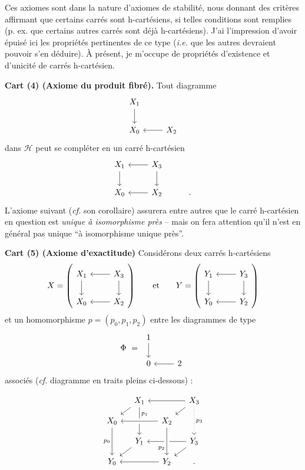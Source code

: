 \noindent Ces axiomes sont dans la nature d'axiomes de stabilité, nous donnant des critères affirmant que certains carrés sont h-cartésiens, si telles conditions sont remplies (p. ex. que certains autres carrés sont déjà h-cartésiens). J'ai l'impression d'avoir épuisé ici les propriétés pertinentes de ce type (\textit{i.e.} que les autres devraient pouvoir s'en déduire). À présent, je m'occupe de propriétés d'existence et d'unicité de carrés h-cartésien. %

\noindent\textbf{Cart (4) (Axiome du produit fibré).} Tout diagramme
\[
\begin{tikzcd}
X_1 \arrow[d] & \\
X_0 & X_2 \arrow[l]
\end{tikzcd}
\]
dans $\mathcal{H}$ peut se compléter en un carré h-cartésien
\[
\begin{tikzcd}
X_1 \arrow[d] & X_3 \arrow[l] \arrow[d] & \\
X_0 & X_2 \arrow[l] & .
\end{tikzcd}
\]
L'axiome suivant (\textit{cf.} son corollaire) assurera entre autres que le carré h-cartésien en question est \textit{unique à isomorphisme près} – mais on fera attention qu'il n'est en général pas unique “à isomorphisme unique près”.


\textbf{Cart (5) (Axiome d'exactitude)} Considérons deux carrés h-cartésiens
\[
X = \left(\begin{tikzcd}
X_1 \ar[d] & X_3 \ar[l] \ar[d] \\
X_0 & X_2 \ar[l]
\end{tikzcd}\right)
\qquad \text{et} \qquad
Y = \left(\begin{tikzcd}
Y_1 \ar[d] & Y_3 \ar[l] \ar[d] \\
Y_0 & Y_2 \ar[l]
\end{tikzcd}\right)
\]
et un homomorphisme $p = (p_0, p_1, p_2)$ entre les diagrammes de type
\[
\Phi \ = \
\begin{tikzcd}
1 \ar[d] & \\
0 & 2 \ar[l]
\end{tikzcd}
\]
associés (\textit{cf.} diagramme en traits pleins ci-dessous) :

\[
\begin{tikzcd}[row sep=small, column sep=small]
& X_1 \ar[dl] \ar[dd, "p_1" near start] & & X_3 \ar[ll] \ar[dl] \ar[dd, dotted, "p_3"] \\
X_0 \ar[dd, "p_0"'] & & X_2 \ar[ll, crossing over] & \\
& Y_1 \ar[dl] & & Y_3 \ar[ll] \ar[dl] \\
Y_0 & & Y_2 \ar[ll] \ar[from=uu, crossing over, "p_2"' near end] & .
\end{tikzcd}
\]

